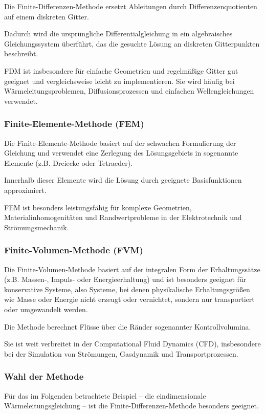 Die Finite-Differenzen-Methode ersetzt Ableitungen durch Differenzenquotienten auf einem diskreten Gitter.

Dadurch wird die ursprüngliche Differentialgleichung in ein algebraisches Gleichungssystem überführt, das die gesuchte Lösung an diskreten Gitterpunkten beschreibt.

FDM ist insbesondere für einfache Geometrien und regelmäßige Gitter gut geeignet und vergleichsweise leicht zu implementieren.
Sie wird häufig bei Wärmeleitungsproblemen, Diffusionsprozessen und einfachen Wellengleichungen verwendet.

\subsubsection{Finite-Elemente-Methode (FEM)}

Die Finite-Elemente-Methode basiert auf der schwachen Formulierung der Gleichung und verwendet eine Zerlegung des Lösungsgebiets in sogenannte Elemente (z.B. Dreiecke oder Tetraeder).

Innerhalb dieser Elemente wird die Lösung durch geeignete Basisfunktionen approximiert.

FEM ist besonders leistungsfähig für komplexe Geometrien, Materialinhomogenitäten und Randwertprobleme in der Elektrotechnik und Strömungsmechanik.

\subsubsection{Finite-Volumen-Methode (FVM)}

Die Finite-Volumen-Methode basiert auf der integralen Form der Erhaltungssätze (z.B. Massen-, Impuls- oder Energieerhaltung) und ist besonders geeignet für konservative Systeme, also Systeme, bei denen physikalische Erhaltungsgrößen wie Masse oder Energie nicht erzeugt oder vernichtet, sondern nur transportiert oder umgewandelt werden.

Die Methode berechnet Flüsse über die Ränder sogenannter Kontrollvolumina.

Sie ist weit verbreitet in der Computational Fluid Dynamics (CFD), insbesondere bei der Simulation von Strömungen, Gasdynamik und Transportprozessen.

\subsubsection{Wahl der Methode}

Für das im Folgenden betrachtete Beispiel – die eindimensionale Wärmeleitungsgleichung – ist die Finite-Differenzen-Methode besonders geeignet.

